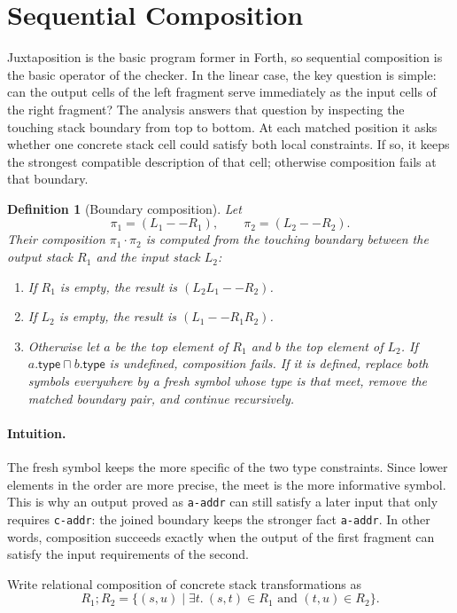 \documentclass[acmsmall,screen,review,anonymous,nonacm]{acmart}
\newtheorem{definition}{Definition}
\newcommand{\glb}{\mathbin{\sqcap}}
\newcommand{\compose}{\mathbin{\cdot}}
\begin{document}
\section{Sequential Composition}
Juxtaposition is the basic program former in Forth, so sequential composition is the
basic operator of the checker. In the linear case, the key question is simple: can the
output cells of the left fragment serve immediately as the input cells of the right
fragment? The analysis answers that question by inspecting the touching stack boundary
from top to bottom. At each matched position it asks whether one concrete stack cell
could satisfy both local constraints. If so, it keeps the strongest compatible
description of that cell; otherwise composition fails at that boundary.

\begin{definition}[Boundary composition]
Let
\[
\pi_1=(L_1 -- R_1), \qquad \pi_2=(L_2 -- R_2).
\]
Their composition $\pi_1 \compose \pi_2$ is computed from the touching boundary between the output stack $R_1$ and the input stack $L_2$:
\begin{enumerate}
\item If $R_1$ is empty, the result is $(L_2L_1 -- R_2)$.
\item If $L_2$ is empty, the result is $(L_1 -- R_1R_2)$.
\item Otherwise let $a$ be the top element of $R_1$ and $b$ the top element of $L_2$.
  If $a.\mathsf{type} \glb b.\mathsf{type}$ is undefined, composition fails.
  If it is defined, replace both symbols everywhere by a fresh symbol whose type is that meet, remove the matched boundary pair, and continue recursively.
\end{enumerate}
\end{definition}

\paragraph{Intuition.}
The fresh symbol keeps the more specific of the two type constraints. Since lower
elements in the order are more precise, the meet is the more informative symbol. This is
why an output proved as \texttt{a-addr} can still satisfy a later input that only
requires \texttt{c-addr}: the joined boundary keeps the stronger fact \texttt{a-addr}.
In other words, composition succeeds exactly when the output of the first fragment can
satisfy the input requirements of the second.

Write relational composition of concrete stack transformations as
\[
R_1 ; R_2 = \{(s,u) \mid \exists t.\ (s,t)\in R_1 \text{ and } (t,u)\in R_2\}.
\]
\end{document}
